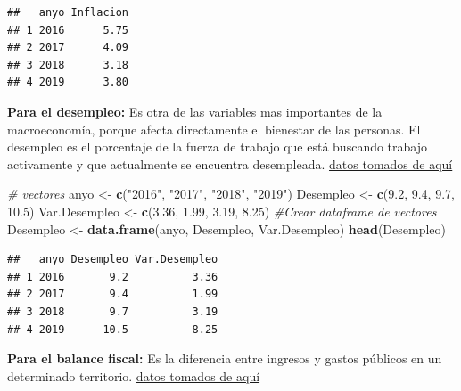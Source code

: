\documentclass[
  11pt,
]{book}
\newenvironment{Shaded}{\begin{snugshade}}{\end{snugshade}}
\newcommand{\CommentTok}[1]{\textcolor[rgb]{0.56,0.35,0.01}{\textit{#1}}}
\newcommand{\FloatTok}[1]{\textcolor[rgb]{0.00,0.00,0.81}{#1}}
\newcommand{\KeywordTok}[1]{\textcolor[rgb]{0.13,0.29,0.53}{\textbf{#1}}}
\newcommand{\NormalTok}[1]{#1}
\newcommand{\StringTok}[1]{\textcolor[rgb]{0.31,0.60,0.02}{#1}}
\begin{document}
\begin{verbatim}
##   anyo Inflacion
## 1 2016      5.75
## 2 2017      4.09
## 3 2018      3.18
## 4 2019      3.80
\end{verbatim}

\textbf{Para el desempleo:} Es otra de las variables mas importantes de
la macroeconomía, porque afecta directamente el bienestar de las
personas. El desempleo es el porcentaje de la fuerza de trabajo que está
buscando trabajo activamente y que actualmente se encuentra desempleada.
\href{https://www.dane.gov.co/index.php/estadisticas-por-tema/mercado-laboral/empleo-y-desempleo}{datos
tomados de aquí}

\begin{Shaded}
\begin{Highlighting}[]
\CommentTok{# vectores }
\NormalTok{anyo <-}\StringTok{ }\KeywordTok{c}\NormalTok{(}\StringTok{"2016"}\NormalTok{, }\StringTok{"2017"}\NormalTok{, }\StringTok{"2018"}\NormalTok{, }\StringTok{"2019"}\NormalTok{)}
\NormalTok{Desempleo <-}\StringTok{ }\KeywordTok{c}\NormalTok{(}\FloatTok{9.2}\NormalTok{, }\FloatTok{9.4}\NormalTok{, }\FloatTok{9.7}\NormalTok{, }\FloatTok{10.5}\NormalTok{)}
\NormalTok{Var.Desempleo <-}\StringTok{ }\KeywordTok{c}\NormalTok{(}\FloatTok{3.36}\NormalTok{, }\FloatTok{1.99}\NormalTok{, }\FloatTok{3.19}\NormalTok{, }\FloatTok{8.25}\NormalTok{)}
\CommentTok{#Crear dataframe de vectores}
\NormalTok{Desempleo <-}\StringTok{ }\KeywordTok{data.frame}\NormalTok{(anyo, Desempleo, Var.Desempleo)}
\KeywordTok{head}\NormalTok{(Desempleo)}
\end{Highlighting}
\end{Shaded}

\begin{verbatim}
##   anyo Desempleo Var.Desempleo
## 1 2016       9.2          3.36
## 2 2017       9.4          1.99
## 3 2018       9.7          3.19
## 4 2019      10.5          8.25
\end{verbatim}

\textbf{Para el balance fiscal:} Es la diferencia entre ingresos y
gastos públicos en un determinado territorio.
\href{http://www.urf.gov.co/webcenter/portal/EntidadesFinancieras/pages_EntidadesFinancieras/PoliticaFiscal/bgg/balancefiscalgobiernocentral?_afrLoop=6729623401772216\&_afrWindowMode=2\&Adf-Window-Id=mof7t7k7j\&_afrFS=16\&_afrMT=screen\&_afrMFW=768\&_afrMFH=720\&_afrMFDW=1536\&_afrMFDH=864\&_afrMFC=8\&_afrMFCI=0\&_afrMFM=0\&_afrMFR=120\&_afrMFG=0\&_afrMFS=0\&_afrMFO=0}{datos
tomados de aquí}
\end{document}
